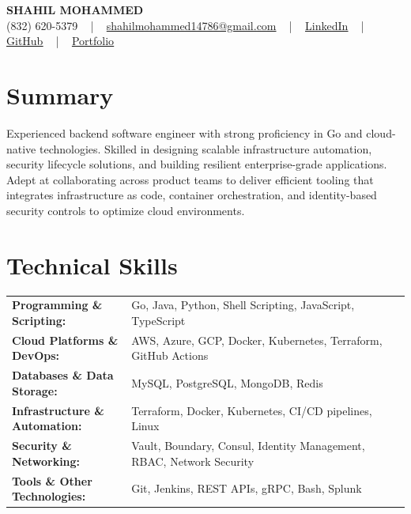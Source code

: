 \documentclass[letterpaper,11pt]{article}
\begin{document}
\begin{center}
    {\fontsize{14pt}{12pt}\selectfont \textbf{\MakeUppercase{Shahil Mohammed}}}\\ \vspace{2pt}
    \fontsize{10pt}{12pt}\selectfont (832) 620-5379 ~ | ~ \href{mailto:shahilmohammed14786@gmail.com}{shahilmohammed14786@gmail.com} ~ | ~  
    \href{https://www.linkedin.com/in/shahil-mohammed-9652931a1/}{\color{blue}\underline{LinkedIn}}  ~ | ~ 
    \href{https://github.com/freakbeast14}{\color{blue}\underline{GitHub}} ~ | ~ 
    \href{https://shahil-mohammed.netlify.app/}{\color{blue}\underline{Portfolio}}
    \vspace{-8pt}
\end{center}

\section{Summary}
\fontsize{9pt}{10pt}\selectfont
Experienced backend software engineer with strong proficiency in Go and cloud-native technologies. Skilled in designing scalable infrastructure automation, security lifecycle solutions, and building resilient enterprise-grade applications. Adept at collaborating across product teams to deliver efficient tooling that integrates infrastructure as code, container orchestration, and identity-based security controls to optimize cloud environments.
 \vspace{-5pt}
 
\section{Technical Skills}
        \vspace{-14pt}
        \begin{table}[h]
            \fontsize{9pt}{10pt}\selectfont
            \begin{tabular}{p{0.3\linewidth} p{0.7\linewidth}}
                \textbf{Programming \& Scripting:} & Go, Java, Python, Shell Scripting, JavaScript, TypeScript \\
                \textbf{Cloud Platforms \& DevOps:} & AWS, Azure, GCP, Docker, Kubernetes, Terraform, GitHub Actions \\
                \textbf{Databases \& Data Storage:} & MySQL, PostgreSQL, MongoDB, Redis \\
                \textbf{Infrastructure \& Automation:} & Terraform, Docker, Kubernetes, CI/CD pipelines, Linux \\
                \textbf{Security \& Networking:} & Vault, Boundary, Consul, Identity Management, RBAC, Network Security \\
                \textbf{Tools \& Other Technologies:} & Git, Jenkins, REST APIs, gRPC, Bash, Splunk \\
            \end{tabular}
        \end{table}
 \vspace{-15pt}
 
\end{document}
